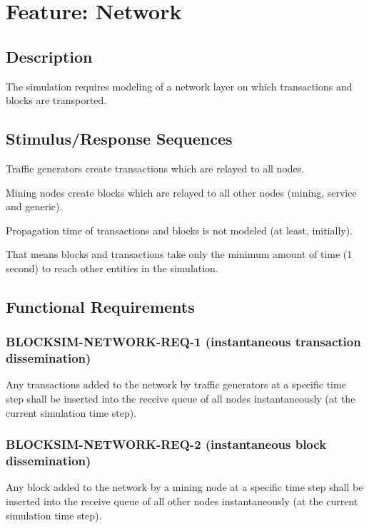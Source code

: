 \documentclass{scrreprt}
\begin{document}
\section{Feature: Network}

\subsection{Description}

The simulation requires modeling of a network layer on which
transactions and blocks are transported.


\subsection{Stimulus/Response Sequences}

Traffic generators create transactions which are relayed to all nodes.

Mining nodes create blocks which are relayed to all other nodes (mining, service and generic).

Propagation time of transactions and blocks is not modeled (at least, initially).

That means blocks and transactions take only the minimum amount of time (1 second) to
reach other entities in the simulation.


\subsection{Functional Requirements}


\subsubsection{BLOCKSIM-NETWORK-REQ-1 (instantaneous transaction dissemination)}

Any transactions added to the network by traffic generators at a specific time step shall be inserted into the receive
queue of all nodes instantaneously (at the current simulation time step).

\subsubsection{BLOCKSIM-NETWORK-REQ-2 (instantaneous block dissemination)}

Any block added to the network by a mining node at a specific time step shall be inserted into the receive
queue of all other nodes instantaneously (at the current simulation time step).
\end{document}
